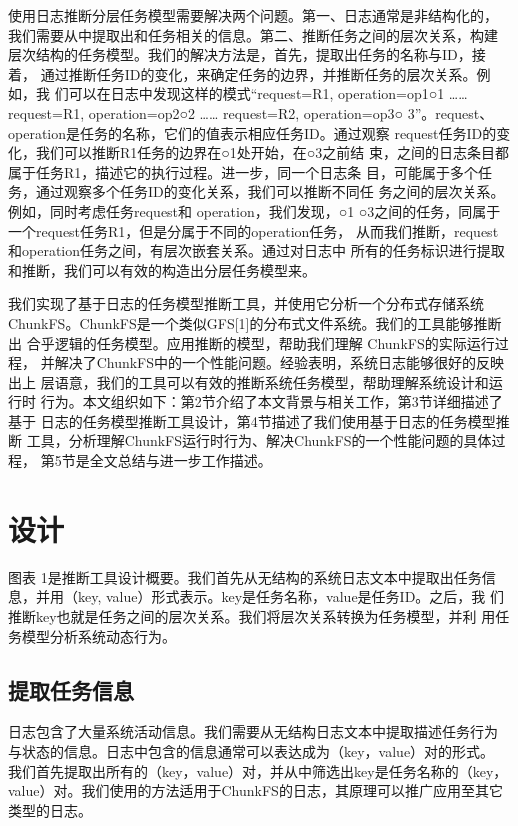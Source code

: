 使用日志推断分层任务模型需要解决两个问题。第一、日志通常是非结构化的，
我们需要从中提取出和任务相关的信息。第二、推断任务之间的层次关系，构建
层次结构的任务模型。我们的解决方法是，首先，提取出任务的名称与ID，接着，
通过推断任务ID的变化，来确定任务的边界，并推断任务的层次关系。例如，我
们可以在日志中发现这样的模式“request=R1, operation=op1○1 ……
request=R1, operation=op2○2 …… request=R2, operation=op3○
3”。request、operation是任务的名称，它们的值表示相应任务ID。通过观察
request任务ID的变化，我们可以推断R1任务的边界在○1处开始，在○3之前结
束，之间的日志条目都属于任务R1，描述它的执行过程。进一步，同一个日志条
目，可能属于多个任务，通过观察多个任务ID的变化关系，我们可以推断不同任
务之间的层次关系。例如，同时考虑任务request和 operation，我们发现，○1
○3之间的任务，同属于一个request任务R1，但是分属于不同的operation任务，
从而我们推断，request和operation任务之间，有层次嵌套关系。通过对日志中
所有的任务标识进行提取和推断，我们可以有效的构造出分层任务模型来。

我们实现了基于日志的任务模型推断工具，并使用它分析一个分布式存储系统
ChunkFS。ChunkFS是一个类似GFS[1]的分布式文件系统。我们的工具能够推断出
合乎逻辑的任务模型。应用推断的模型，帮助我们理解 ChunkFS的实际运行过程，
并解决了ChunkFS中的一个性能问题。经验表明，系统日志能够很好的反映出上
层语意，我们的工具可以有效的推断系统任务模型，帮助理解系统设计和运行时
行为。本文组织如下：第2节介绍了本文背景与相关工作，第3节详细描述了基于
日志的任务模型推断工具设计，第4节描述了我们使用基于日志的任务模型推断
工具，分析理解ChunkFS运行时行为、解决ChunkFS的一个性能问题的具体过程，
第5节是全文总结与进一步工作描述。

\section{设计}

图表 1是推断工具设计概要。我们首先从无结构的系统日志文本中提取出任务信
息，并用（key, value）形式表示。key是任务名称，value是任务ID。之后，我
们推断key也就是任务之间的层次关系。我们将层次关系转换为任务模型，并利
用任务模型分析系统动态行为。

\subsection{提取任务信息}

日志包含了大量系统活动信息。我们需要从无结构日志文本中提取描述任务行为
与状态的信息。日志中包含的信息通常可以表达成为（key，value）对的形式。
我们首先提取出所有的（key，value）对，并从中筛选出key是任务名称的（key，
value）对。我们使用的方法适用于ChunkFS的日志，其原理可以推广应用至其它
类型的日志。

